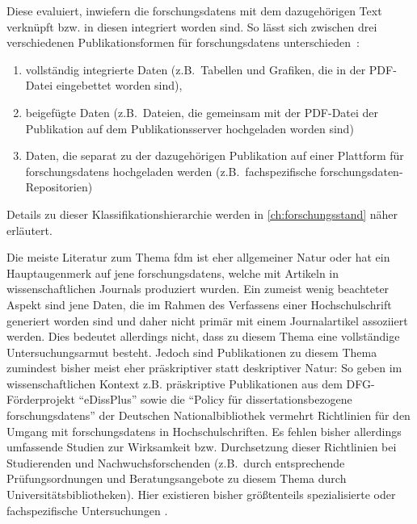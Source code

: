 Diese evaluiert, inwiefern die \glspl{forschungsdaten} mit dem dazugehörigen Text verknüpft bzw. in diesen integriert worden sind.
So lässt sich zwischen drei verschiedenen Publikationsformen für \glspl{forschungsdaten} unterschieden~\autocites[S.~36ff.]{ReillyEtAl2011}:
\begin{enumerate}
    \item vollständig integrierte Daten (z.B.~Tabellen und Grafiken, die in der PDF-Datei eingebettet worden sind),
    \item beigefügte Daten (z.B.~Dateien, die gemeinsam mit der PDF-Datei der Publikation auf dem Publikationsserver hochgeladen worden sind)
    \item Daten, die separat zu der dazugehörigen Publikation auf einer Plattform für \glspl{forschungsdaten} hochgeladen werden (z.B.~fachspezifische \gls{forschungsdaten}-Repositorien)
\end{enumerate}
Details zu dieser Klassifikationshierarchie werden in \cref{ch:forschungsstand} näher erläutert.

Die meiste Literatur zum Thema \gls{fdm} ist eher allgemeiner Natur oder hat ein Hauptaugenmerk auf jene \glspl{forschungsdaten}, welche mit Artikeln in wissenschaftlichen Journals produziert wurden. Ein zumeist wenig beachteter Aspekt sind jene Daten, die im Rahmen des Verfassens einer Hochschulschrift generiert worden sind und daher nicht primär mit einem Journalartikel assoziiert werden.
Dies bedeutet allerdings nicht, dass zu diesem Thema eine vollständige Untersuchungsarmut besteht.
Jedoch sind Publikationen zu diesem Thema zumindest bisher meist eher präskriptiver statt deskriptiver Natur:
So geben im wissenschaftlichen Kontext z.B. präskriptive Publikationen aus dem DFG-Förderprojekt \enquote{eDissPlus} \autocite{Weisbrod2017eDissPlus, KleinebergKaden2018, Weisbrod2018} sowie die \enquote{Policy für dissertationsbezogene \glspl{forschungsdaten}} der Deutschen Nationalbibliothek \autocite{dnb2017} vermehrt Richtlinien für den Umgang mit \glspl{forschungsdaten} in Hochschulschriften.
Es fehlen bisher allerdings umfassende Studien zur Wirksamkeit bzw.
Durchsetzung dieser Richtlinien bei Studierenden und Nachwuchsforschenden (z.B.~durch entsprechende Prüfungsordnungen und Beratungsangebote zu diesem Thema durch Universitätsbibliotheken).
Hier existieren bisher größtenteils spezialisierte oder fachspezifische Untersuchungen \autocite{Schöpfel2015,Wünsche2018Forschungsdaten}.

